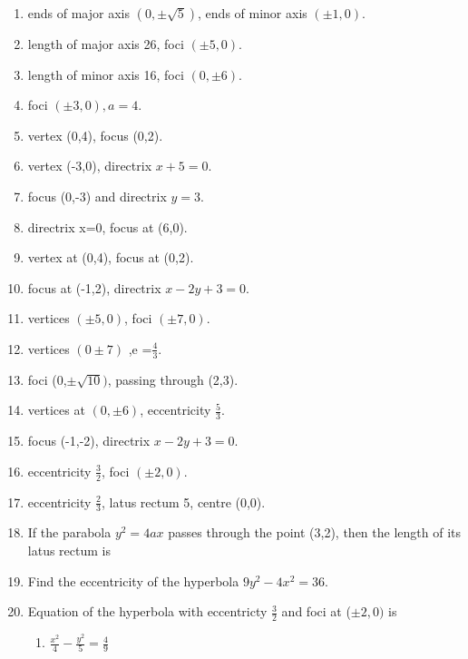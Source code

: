 \begin{enumerate}[label=\thesubsection.\arabic*,ref=\thesubsection.\theenumi,resume*]
\item ends of major axis $(0,\pm \sqrt{5})$, ends of minor axis $(\pm1,0)$.
\item length of major axis 26, foci $(\pm5,0)$.
\item length of minor axis 16, foci $(0,\pm6)$.
\item foci $(\pm3,0), a=4$.
\item vertex (0,4),  focus (0,2). 
\item vertex (-3,0),  directrix $x+5=0$.
\item focus (0,-3) and directrix $y=3$.
\item  directrix x=0, focus at (6,0).
\item  vertex  at (0,4), focus at (0,2).
\item  focus at (-1,2), directrix $x-2y+3=0$.
	 \item  vertices $(\pm5,0)$, foci $(\pm 7,0)$.
	 \item vertices $(0\pm7)$ ,e =$\frac{4}{3}$. 
	 \item  foci (0,$\pm\sqrt{10})$, passing through (2,3).
\item vertices at $(0,\pm6)$,  eccentricity $\frac{5}{3}$.
\item focus (-1,-2),  directrix $x-2y+3=0$.
\item eccentricity $\frac{3}{2}$, foci $(\pm2,0)$.
 \item eccentricity $\frac{2}{3}$, latus rectum 5, centre  (0,0).
\item If the parabola $y^2=4ax$ passes through the point (3,2), then the length of its latus rectum is
\item Find the eccentricity of the hyperbola $9y^2-4x^2=36$.
	\item Equation of the hyperbola with eccentricty $\frac{3}{2}$ and foci at ($\pm2,0)$ is
\begin{enumerate} 
	\item $\frac{x^2}{4}-\frac{y^2}{5}=\frac{4}{9}$


\end{enumerate}
\end{enumerate}
